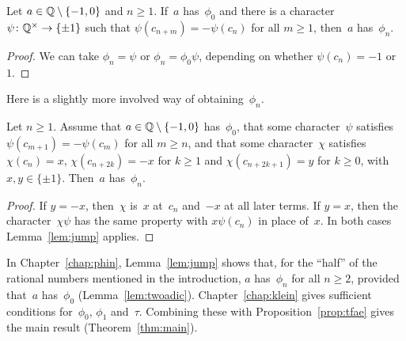\begin{lemma}
  \label{lem:jump}
  \leanok
  Let $a \in \mathbb{Q} \setminus \{-1, 0\}$ and $n \ge 1$. If~$a$ has~$\phi_0$ and there is a character
  $\psi \colon \mathbb{Q}^\times \to \{\pm 1\}$ such that $\psi(c_{n+m}) = -\psi(c_n)$ for all $m \ge 1$,
  then~$a$ has~$\phi_n$.
\end{lemma}
\begin{proof}
  \leanok
  We can take $\phi_n = \psi$ or $\phi_n = \phi_0 \psi$, depending on whether $\psi(c_n) = -1$
  or~$1$.
\end{proof}

Here is a slightly more involved way of obtaining~$\phi_n$.

\begin{lemma}
  \label{lem:jump2}
  \leanok
  Let $n \ge 1$. Assume that $a \in \mathbb{Q} \setminus \{-1, 0\}$ has~$\phi_0$, that some
  character~$\psi$ satisfies $\psi(c_{m+1}) = -\psi(c_m)$ for all $m \ge n$, and that some
  character~$\chi$ satisfies $\chi(c_n) = x$, $\chi(c_{n+2k}) = -x$ for $k \ge 1$ and
  $\chi(c_{n+2k+1}) = y$ for $k \ge 0$, with $x, y \in \{\pm 1\}$. Then~$a$ has~$\phi_n$.
\end{lemma}
\begin{proof}
  \leanok
  If $y = -x$, then~$\chi$ is~$x$ at~$c_n$ and~$-x$ at all later terms. If $y = x$, then the
  character~$\chi \psi$ has the same property with $x \psi(c_n)$ in place of~$x$. In both cases
  Lemma~\ref{lem:jump} applies.
\end{proof}

In Chapter~\ref{chap:phin}, Lemma~\ref{lem:jump} shows that, for the ``half'' of the rational
numbers mentioned in the introduction, $a$ has~$\phi_n$ for all $n \ge 2$, provided that~$a$
has~$\phi_0$ (Lemma~\ref{lem:twoadic}). Chapter~\ref{chap:klein} gives sufficient conditions
for~$\phi_0$, $\phi_1$ and~$\tau$. Combining these with Proposition~\ref{prop:tfae} gives the
main result (Theorem~\ref{thm:main}).
